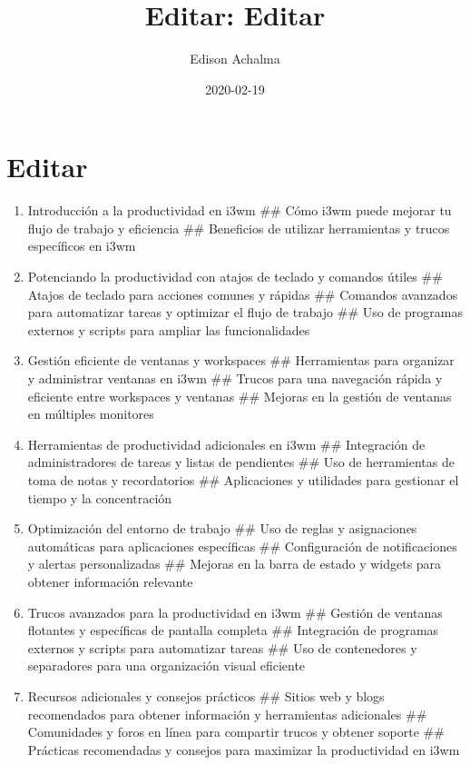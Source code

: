 \documentclass[
  jou,
  floatsintext,
  longtable,
  a4paper,
  nolmodern,
  notxfonts,
  notimes,
  colorlinks=true,linkcolor=blue,citecolor=blue,urlcolor=blue]{apa7}
\title{Editar: Editar}
\author{Edison Achalma}
\affiliation{
{Escuela Profesional de Economía, Universidad Nacional de San Cristóbal
de Huamanga}}
\date{2020-02-19}
\begin{document}
\maketitle

\hypertarget{toc}{}
\tableofcontents
\newpage
\section[Introduction]{Editar}

\setcounter{secnumdepth}{5}

\setlength\LTleft{0pt}


\begin{enumerate}
\def\labelenumi{\arabic{enumi}.}
\item
  Introducción a la productividad en i3wm \#\# Cómo i3wm puede mejorar
  tu flujo de trabajo y eficiencia \#\# Beneficios de utilizar
  herramientas y trucos específicos en i3wm
\item
  Potenciando la productividad con atajos de teclado y comandos útiles
  \#\# Atajos de teclado para acciones comunes y rápidas \#\# Comandos
  avanzados para automatizar tareas y optimizar el flujo de trabajo \#\#
  Uso de programas externos y scripts para ampliar las funcionalidades
\item
  Gestión eficiente de ventanas y workspaces \#\# Herramientas para
  organizar y administrar ventanas en i3wm \#\# Trucos para una
  navegación rápida y eficiente entre workspaces y ventanas \#\# Mejoras
  en la gestión de ventanas en múltiples monitores
\item
  Herramientas de productividad adicionales en i3wm \#\# Integración de
  administradores de tareas y listas de pendientes \#\# Uso de
  herramientas de toma de notas y recordatorios \#\# Aplicaciones y
  utilidades para gestionar el tiempo y la concentración
\item
  Optimización del entorno de trabajo \#\# Uso de reglas y asignaciones
  automáticas para aplicaciones específicas \#\# Configuración de
  notificaciones y alertas personalizadas \#\# Mejoras en la barra de
  estado y widgets para obtener información relevante
\item
  Trucos avanzados para la productividad en i3wm \#\# Gestión de
  ventanas flotantes y específicas de pantalla completa \#\# Integración
  de programas externos y scripts para automatizar tareas \#\# Uso de
  contenedores y separadores para una organización visual eficiente
\item
  Recursos adicionales y consejos prácticos \#\# Sitios web y blogs
  recomendados para obtener información y herramientas adicionales \#\#
  Comunidades y foros en línea para compartir trucos y obtener soporte
  \#\# Prácticas recomendadas y consejos para maximizar la productividad
  en i3wm
\end{enumerate}
\end{document}
